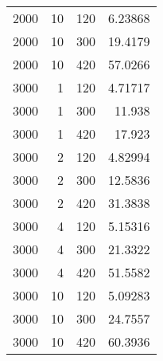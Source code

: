 \begin{tabular}{rrrr}
       2000 &         10 &            120 &                       6.23868 \\
       2000 &         10 &            300 &                      19.4179  \\
       2000 &         10 &            420 &                      57.0266  \\
       3000 &          1 &            120 &                       4.71717 \\
       3000 &          1 &            300 &                      11.938   \\
       3000 &          1 &            420 &                      17.923   \\
       3000 &          2 &            120 &                       4.82994 \\
       3000 &          2 &            300 &                      12.5836  \\
       3000 &          2 &            420 &                      31.3838  \\
       3000 &          4 &            120 &                       5.15316 \\
       3000 &          4 &            300 &                      21.3322  \\
       3000 &          4 &            420 &                      51.5582  \\
       3000 &         10 &            120 &                       5.09283 \\
       3000 &         10 &            300 &                      24.7557  \\
       3000 &         10 &            420 &                      60.3936  \\
\hline
\end{tabular}
